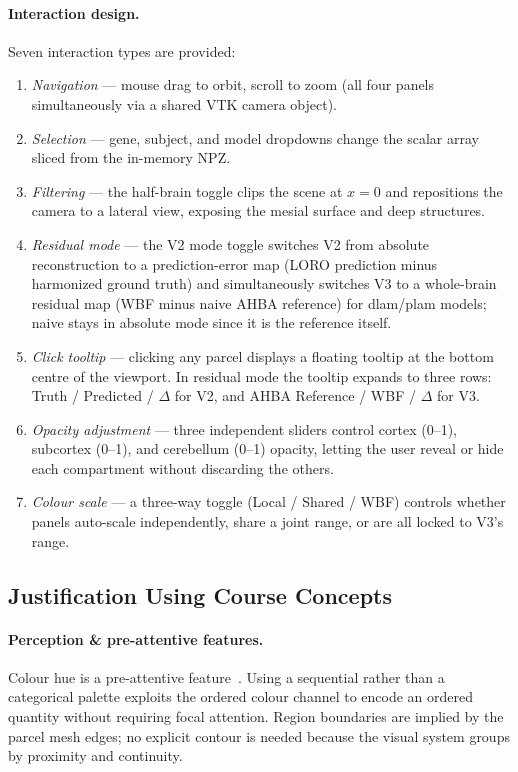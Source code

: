 \documentclass[11pt,letterpaper]{article}
\begin{document}
\paragraph{Interaction design.}
Seven interaction types are provided:
\begin{enumerate}[nosep]
  \item \emph{Navigation} — mouse drag to orbit, scroll to zoom (all four
        panels simultaneously via a shared VTK camera object).
  \item \emph{Selection} — gene, subject, and model dropdowns change the
        scalar array sliced from the in-memory NPZ.
  \item \emph{Filtering} — the half-brain toggle clips the scene at $x=0$
        and repositions the camera to a lateral view, exposing the
        mesial surface and deep structures.
  \item \emph{Residual mode} — the V2 mode toggle switches V2 from absolute
        reconstruction to a prediction-error map (LORO prediction minus
        harmonized ground truth) and simultaneously switches V3 to a
        whole-brain residual map (WBF minus naive AHBA reference) for
        dlam/plam models; naive stays in absolute mode since it is the
        reference itself.
  \item \emph{Click tooltip} — clicking any parcel displays a floating
        tooltip at the bottom centre of the viewport.  In residual mode the
        tooltip expands to three rows: Truth / Predicted / $\Delta$ for V2,
        and AHBA Reference / WBF / $\Delta$ for V3.
  \item \emph{Opacity adjustment} — three independent sliders control
        cortex (0--1), subcortex (0--1), and cerebellum (0--1) opacity,
        letting the user reveal or hide each compartment without discarding
        the others.
  \item \emph{Colour scale} — a three-way toggle (Local / Shared / WBF)
        controls whether panels auto-scale independently, share a joint
        range, or are all locked to V3's range.
\end{enumerate}

\subsection{Justification Using Course Concepts}

\paragraph{Perception \& pre-attentive features.}
Colour hue is a pre-attentive feature~\citep{ware2004}.
Using a sequential rather than a categorical palette exploits the
ordered colour channel to encode an ordered quantity without requiring
focal attention.
Region boundaries are implied by the parcel mesh edges; no explicit
contour is needed because the visual system groups by proximity and
continuity.
\end{document}
